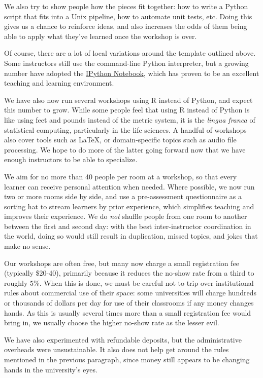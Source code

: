 \documentclass[10pt,a4paper,twocolumn]{article}
\begin{document}
We also try to show people how the pieces fit together: how to write a
Python script that fits into a Unix pipeline, how to automate unit
tests, etc. Doing this gives us a chance to reinforce ideas, and also
increases the odds of them being able to apply what they've learned
once the workshop is over.

Of course, there are a lot of local variations around the template
outlined above. Some instructors still use the command-line Python
interpreter, but a growing number have adopted the
\href{http://ipython.org/notebook.html}{IPython Notebook}, which has
proven to be an excellent teaching and learning environment.

We have also now run several workshops using R instead of Python, and
expect this number to grow. While some people feel that using R instead
of Python is like using feet and pounds instead of the metric system, it
is the \emph{lingua franca} of statistical computing, particularly in
the life sciences. A handful of workshops also cover tools such as
LaTeX, or domain-specific topics such as audio file processing. We hope
to do more of the latter going forward now that we have enough
instructors to be able to specialize.

We aim for no more than 40 people per room at a workshop, so that
every learner can receive personal attention when needed.  Where
possible, we now run two or more rooms side by side, and use a
pre-assessment questionnaire as a sorting hat to stream learners by
prior experience, which simplifies teaching and improves their
experience.  We do \emph{not} shuffle people from one room to another
between the first and second day: with the best inter-instructor
coordination in the world, doing so would still result in duplication,
missed topics, and jokes that make no sense.

Our workshops are often free, but many now charge a small registration
fee (typically \$20-40), primarily because it reduces the no-show rate
from a third to roughly 5\%.  When this is done, we must be careful
not to trip over institutional rules about commercial use of their
space: some universities will charge hundreds or thousands of dollars
per day for use of their classrooms if any money changes hands.  As
this is usually several times more than a small registration fee would
bring in, we usually choose the higher no-show rate as the lesser
evil.

We have also experimented with refundable deposits, but the
administrative overheads were unsustainable.  It also does not help
get around the rules mentioned in the previous paragraph, since money
still appears to be changing hands in the university's eyes.
\end{document}
